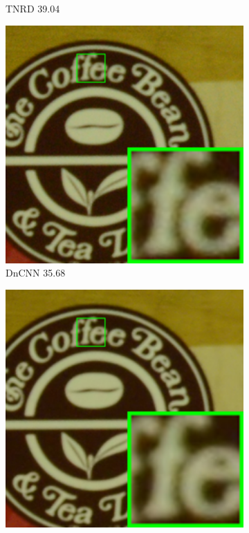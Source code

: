 \begin{figure}
\begin{subfigure}[t]{0.19\textwidth}
\caption{TNRD 39.04}
    \end{subfigure}
\hfill
    \begin{subfigure}[t]{0.19\textwidth}
        \centering
        \includegraphics[width=1\textwidth]{images/guided/cc60/resize_br_DnCNN_CC_Noisy_Nikon_D800_ISO_1600_B2_109.png}
		\caption{DnCNN 35.68}
    \end{subfigure}
    \hfill
    \begin{subfigure}[t]{0.19\textwidth}
        \centering
        \includegraphics[width=1\textwidth]{images/guided/cc60/resize_br_NI_CC_Noisy_Nikon_D800_ISO_1600_B2_109.png}

\end{subfigure}
\end{figure}
